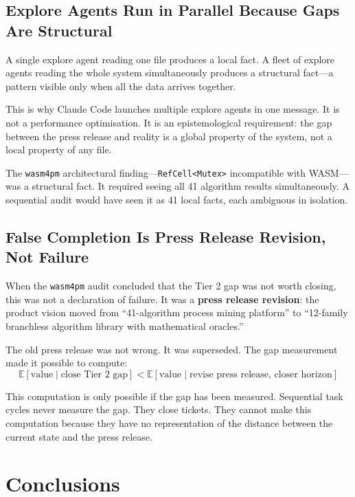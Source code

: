 \documentclass[11pt,a4paper]{article}
\newcommand{\code}[1]{\texttt{#1}}
\begin{document}
\subsection{Explore Agents Run in Parallel Because Gaps Are Structural}

A single explore agent reading one file produces a local fact.  A fleet of
explore agents reading the whole system simultaneously produces a structural
fact---a pattern visible only when all the data arrives together.

This is why Claude Code launches multiple explore agents in one message.  It is
not a performance optimisation.  It is an epistemological requirement: the gap
between the press release and reality is a global property of the system, not
a local property of any file.

The \code{wasm4pm} architectural finding---\code{RefCell<Mutex>} incompatible
with WASM---was a structural fact.  It required seeing all 41 algorithm results
simultaneously.  A sequential audit would have seen it as 41 local facts, each
ambiguous in isolation.

\subsection{False Completion Is Press Release Revision, Not Failure}

When the \code{wasm4pm} audit concluded that the Tier 2 gap was not worth
closing, this was not a declaration of failure.  It was a \textbf{press release
revision}: the product vision moved from ``41-algorithm process mining
platform'' to ``12-family branchless algorithm library with mathematical
oracles.''

The old press release was not wrong.  It was superseded.  The gap measurement
made it possible to compute:
\[
  \mathbb{E}[\text{value} \mid \text{close Tier 2 gap}]
  < \mathbb{E}[\text{value} \mid \text{revise press release, closer horizon}]
\]

This computation is only possible if the gap has been measured.  Sequential
task cycles never measure the gap.  They close tickets.  They cannot make this
computation because they have no representation of the distance between the
current state and the press release.

\section{Conclusions}
\end{document}
